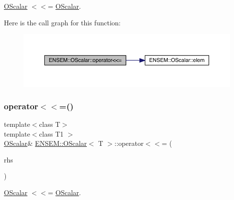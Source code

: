 \mbox{\hyperlink{classENSEM_1_1OScalar}{O\+Scalar}} $<$$<$= \mbox{\hyperlink{classENSEM_1_1OScalar}{O\+Scalar}}. 

Here is the call graph for this function\+:
\nopagebreak
\begin{figure}[H]
\begin{center}
\leavevmode
\includegraphics[width=350pt]{da/d80/classENSEM_1_1OScalar_a93607b92c63ae779d9d3ed131df3f449_cgraph}
\end{center}
\end{figure}
\mbox{\label{classENSEM_1_1OScalar_a93607b92c63ae779d9d3ed131df3f449}} 
\subsubsection{\texorpdfstring{operator$<$$<$=()}{operator<<=()}\hspace{0.1cm}{\footnotesize\ttfamily [2/2]}}
{\footnotesize\ttfamily template$<$class T$>$ \\
template$<$class T1 $>$ \\
\mbox{\hyperlink{classENSEM_1_1OScalar}{O\+Scalar}}\& \mbox{\hyperlink{classENSEM_1_1OScalar}{E\+N\+S\+E\+M\+::\+O\+Scalar}}$<$ T $>$\+::operator$<$$<$= (\begin{DoxyParamCaption}\item[{const \mbox{\hyperlink{classENSEM_1_1OScalar}{O\+Scalar}}$<$ T1 $>$ \&}]{rhs }\end{DoxyParamCaption})\hspace{0.3cm}{\ttfamily [inline]}}



\mbox{\hyperlink{classENSEM_1_1OScalar}{O\+Scalar}} $<$$<$= \mbox{\hyperlink{classENSEM_1_1OScalar}{O\+Scalar}}. 

